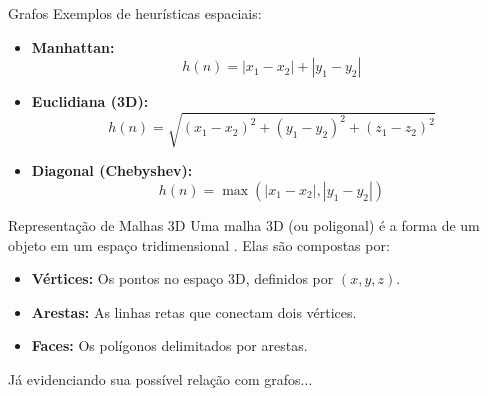 \documentclass[11pt]{beamer}
\begin{document}
\begin{frame}{Grafos}
    Exemplos de heurísticas espaciais:
    \begin{itemize}
        \item \textbf{Manhattan:} 
        \begin{equation}
            h(n) = |x_1 - x_2| + |y_1 - y_2|
        \end{equation}
        \vspace{0.5em}

        \item \textbf{Euclidiana (3D):}
        \begin{equation}
            h(n) = \sqrt{(x_1 - x_2)^2 + (y_1 - y_2)^2 + (z_1 - z_2)^2}
        \end{equation}
        \vspace{0.5em}

        \item \textbf{Diagonal (Chebyshev):}
        \begin{equation}
            h(n) = \max(|x_1 - x_2|, |y_1 - y_2|)
        \end{equation}
    \end{itemize}
\end{frame}

\begin{frame}{Representação de Malhas 3D}
    Uma malha 3D (ou poligonal) é a forma de um objeto em um espaço tridimensional \cite{learnopengl}. Elas são compostas por:
    \begin{itemize}
        \item \textbf{Vértices:} Os pontos no espaço 3D, definidos por $(x, y, z)$.
        \item \textbf{Arestas:} As linhas retas que conectam dois vértices.
        \item \textbf{Faces:} Os polígonos delimitados por arestas.
    \end{itemize}
    \vspace{1em}
    Já evidenciando sua possível relação com grafos...
\end{frame}
\end{document}
